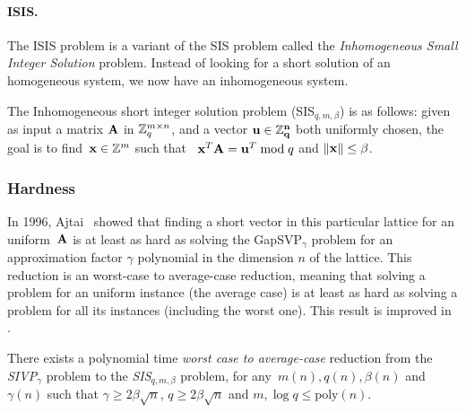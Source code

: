 \paragraph{ISIS.} The ISIS problem is a variant of the SIS problem called the \emph{Inhomogeneous Small Integer Solution} problem. Instead of looking for a short solution of an homogeneous system, we now have an inhomogeneous system.
 
\begin{definition}\label{def:ISIS}
The Inhomogeneous short integer solution problem (SIS$_{q,m,\beta}$) is as follows: given as input a matrix $\bf A$  in $\mathbb{Z}_q^{m \times n}$, and a vector $\bf{u} \in \mathbb{Z}_q^n$ both uniformly chosen, the goal is to find~${\bf x} \in \mathbb{Z}^{m}$ such that~ ${\bf x}^T {\bf A} = {\bf u}^T \bmod q$ and $\|{\bf x}\| \leq \beta $. 

\end{definition}


\subsubsection{Hardness}

In 1996, Ajtai~\cite{Ajtai96} showed that finding a short vector in this particular lattice for an uniform~$\bf A$ is at least as hard as solving the GapSVP$_{\gamma}$ problem for an approximation factor $\gamma$ polynomial in the dimension $n$ of the lattice.
This reduction is an worst-case to average-case reduction, meaning that solving a problem for an uniform instance (the average case) is at least as hard as solving a problem for all its instances (including the worst one). This result is improved in \cite{MR04,GPV08}.



\begin{theorem}
\label{th:GPV_SIS}\label{WCAV}
There exists a polynomial time \emph{worst case to average-case} reduction from the \emph{SIVP}$_{\gamma}$ problem to the \emph{SIS}$_{q,m,\beta}$ problem, for any~$m(n), q(n), \beta(n)$ and~$\gamma(n)$ such that $\gamma \geq 2 \beta \sqrt{n}$, $q \geq 2 \beta \sqrt{n}$ and $m,  \log q \leq \text{poly}(n)$.
\end{theorem}


